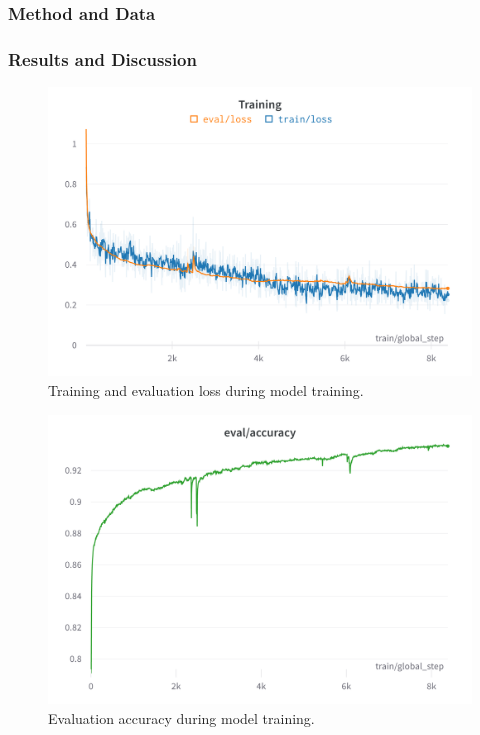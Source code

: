 \subsubsection{Method and Data}
\subsubsection{Results and Discussion}


\begin{figure}[htp]
    \centering
    \includegraphics[width=\textwidth]{figures/wandb-train-loss-gpt-j-smart-contract.png}
    \caption{Training and evaluation loss during model training.}
\end{figure}

\begin{figure}[htp]
    \centering
    \includegraphics[width=\textwidth]{figures/wandb-train-eval-gpt-j-smart-contract.png}
    \caption{Evaluation accuracy during model training.}
\end{figure}


